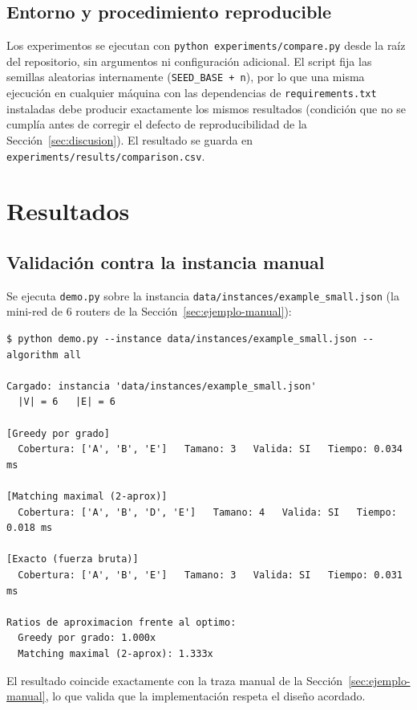 \documentclass[11pt,a4paper]{article}
\begin{document}
\subsection{Entorno y procedimiento reproducible}
Los experimentos se ejecutan con \texttt{python experiments/compare.py} desde la raíz del
repositorio, sin argumentos ni configuración adicional. El script fija las semillas
aleatorias internamente (\texttt{SEED\_BASE + n}), por lo que una misma ejecución en
cualquier máquina con las dependencias de \texttt{requirements.txt} instaladas debe producir
exactamente los mismos resultados (condición que no se cumplía antes de corregir el defecto
de reproducibilidad de la Sección~\ref{sec:discusion}). El resultado se guarda en
\texttt{experiments/results/comparison.csv}.

\section{Resultados}
\label{sec:resultados}

\subsection{Validación contra la instancia manual}
Se ejecuta \texttt{demo.py} sobre la instancia \texttt{data/instances/example\_small.json}
(la mini-red de 6 routers de la Sección~\ref{sec:ejemplo-manual}):

\begin{lstlisting}
$ python demo.py --instance data/instances/example_small.json --algorithm all

Cargado: instancia 'data/instances/example_small.json'
  |V| = 6   |E| = 6

[Greedy por grado]
  Cobertura: ['A', 'B', 'E']   Tamano: 3   Valida: SI   Tiempo: 0.034 ms

[Matching maximal (2-aprox)]
  Cobertura: ['A', 'B', 'D', 'E']   Tamano: 4   Valida: SI   Tiempo: 0.018 ms

[Exacto (fuerza bruta)]
  Cobertura: ['A', 'B', 'E']   Tamano: 3   Valida: SI   Tiempo: 0.031 ms

Ratios de aproximacion frente al optimo:
  Greedy por grado: 1.000x
  Matching maximal (2-aprox): 1.333x
\end{lstlisting}

El resultado coincide exactamente con la traza manual de la Sección~\ref{sec:ejemplo-manual},
lo que valida que la implementación respeta el diseño acordado.
\end{document}
